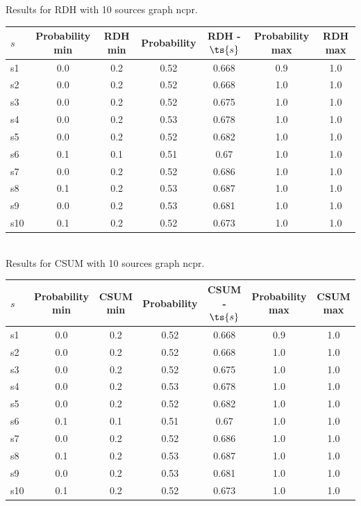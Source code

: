 \documentclass{article}
\begin{document}
\noindent Results for RDH with 10 sources graph ncpr.

\noindent\begin{tabular}{|l|c|c|c|c|c|c|}
\hline
$s$& Probability min & RDH min & Probability & RDH - $\ts{s}$ & Probability max & RDH max\\
\hline
s1 &0.0 & 0.2 & 0.52 & 0.668 & 0.9 & 1.0\\
\hline
s2 &0.0 & 0.2 & 0.52 & 0.668 & 1.0 & 1.0\\
\hline
s3 &0.0 & 0.2 & 0.52 & 0.675 & 1.0 & 1.0\\
\hline
s4 &0.0 & 0.2 & 0.53 & 0.678 & 1.0 & 1.0\\
\hline
s5 &0.0 & 0.2 & 0.52 & 0.682 & 1.0 & 1.0\\
\hline
s6 &0.1 & 0.1 & 0.51 & 0.67 & 1.0 & 1.0\\
\hline
s7 &0.0 & 0.2 & 0.52 & 0.686 & 1.0 & 1.0\\
\hline
s8 &0.1 & 0.2 & 0.53 & 0.687 & 1.0 & 1.0\\
\hline
s9 &0.0 & 0.2 & 0.53 & 0.681 & 1.0 & 1.0\\
\hline
s10 &0.1 & 0.2 & 0.52 & 0.673 & 1.0 & 1.0\\
\hline
\end{tabular}\\

\noindent Results for CSUM with 10 sources graph ncpr.

\noindent\begin{tabular}{|l|c|c|c|c|c|c|}
\hline
$s$& Probability min & CSUM min & Probability & CSUM - $\ts{s}$ & Probability max & CSUM max\\
\hline
s1 &0.0 & 0.2 & 0.52 & 0.668 & 0.9 & 1.0\\
\hline
s2 &0.0 & 0.2 & 0.52 & 0.668 & 1.0 & 1.0\\
\hline
s3 &0.0 & 0.2 & 0.52 & 0.675 & 1.0 & 1.0\\
\hline
s4 &0.0 & 0.2 & 0.53 & 0.678 & 1.0 & 1.0\\
\hline
s5 &0.0 & 0.2 & 0.52 & 0.682 & 1.0 & 1.0\\
\hline
s6 &0.1 & 0.1 & 0.51 & 0.67 & 1.0 & 1.0\\
\hline
s7 &0.0 & 0.2 & 0.52 & 0.686 & 1.0 & 1.0\\
\hline
s8 &0.1 & 0.2 & 0.53 & 0.687 & 1.0 & 1.0\\
\hline
s9 &0.0 & 0.2 & 0.53 & 0.681 & 1.0 & 1.0\\
\hline
s10 &0.1 & 0.2 & 0.52 & 0.673 & 1.0 & 1.0\\
\hline
\end{tabular}\\
\end{document}
